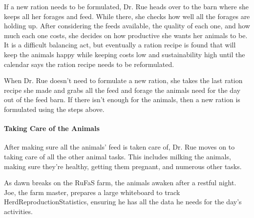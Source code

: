 \documentclass{article}
\begin{document}
If a new ration needs to be formulated, Dr. Rue heads over to the barn where she keeps all her forages and feed. While there, she checks how well all the forages are holding up. After considering the feeds available, the quality of each one, and how much each one costs, she decides on how productive she wants her animals to be. It is a difficult balancing act, but eventually a ration recipe is found that will keep the animals happy while keeping costs low and sustainability high until the calendar says the ration recipe needs to be reformulated.
\vspace{0.2cm}

When Dr. Rue doesn’t need to formulate a new ration, she takes the last ration recipe she made and grabs all the feed and forage the animals need for the day out of the feed barn. If there isn’t enough for the animals, then a new ration is formulated using the steps above.

\paragraph{Taking Care of the Animals}
After making sure all the animals’ feed is taken care of, Dr. Rue moves on to taking care of all the other animal tasks. This includes milking the animals, making sure they’re healthy, getting them pregnant, and numerous other tasks. 
\vspace{0.2cm}

As dawn breaks on the RuFaS farm, the animals awaken after a restful night. Joe, the farm master, prepares a large whiteboard to track HerdReproductionStatistics, ensuring he has all the data he needs for the day’s activities.
\end{document}
